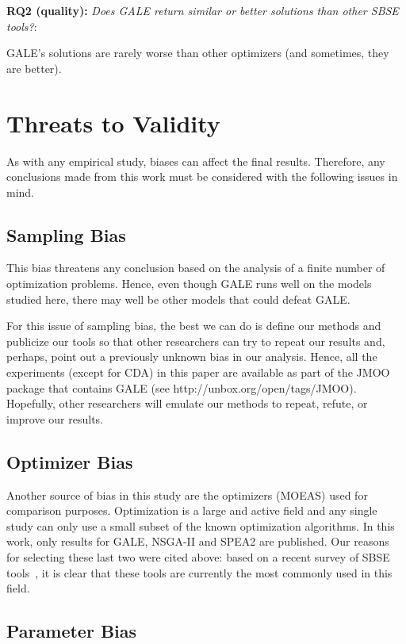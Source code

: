 \documentclass[10pt,journal,compsoc]{IEEEtran}
\begin{document}
{\bf RQ2 (quality):} {\em Does  GALE  return  similar or better solutions than other SBSE tools?}:

GALE's solutions are rarely worse than other optimizers (and sometimes, they are 
better).


\section{Threats to Validity}

As with any empirical study, biases can affect the
final results. Therefore, any conclusions made from
this work must be considered with the following
issues in mind.

\subsection{ Sampling Bias}
This bias threatens any conclusion based on the
analysis of a finite number of optimization
problems.  Hence, even though GALE runs well on
the models studied here, there may well be other
models that could defeat GALE.  

For this issue of sampling bias, the best we can do
is define our methods and publicize our tools so
that other researchers can try to repeat our results
and, perhaps, point out a previously unknown bias in
our analysis. Hence, all the experiments (except for
CDA) in this paper are available as part of the JMOO
package that contains GALE (see
http://unbox.org/open/tags/JMOO).  Hopefully, other
researchers will emulate our methods to repeat,
refute, or improve our results.

\subsection{Optimizer Bias}
Another source of bias in this
study are the optimizers (MOEAS) used for comparison purposes.
Optimization is a large and active field
and any single study can only use a small subset of
the known optimization algorithms. In this work,
only results for GALE, NSGA-II and SPEA2 are published. Our reasons for selecting
these last two were cited above: based on a recent survey of SBSE tools~\cite{sayyad13c}, it is clear
that these tools are currently the most commonly used in this field.

\subsection{Parameter Bias}
\end{document}
